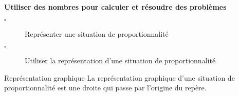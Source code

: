 \begin{titre}[La proportionnalité]

\end{titre}


\begin{CpsCol}
\textbf{Utiliser des nombres pour calculer et résoudre des problèmes}
\begin{description}
\item[$\square$] Représenter une situation de proportionnalité
\item[$\square$] Utiliser la représentation d'une situation de proportionnalité
\end{description}
\end{CpsCol}


\begin{DefT}{Représentation graphique}
La représentation graphique d'une situation de proportionnalité est une droite qui passe par l'origine du repère.
\end{DefT}
